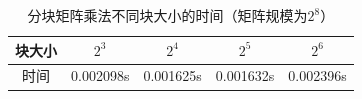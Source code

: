 \documentclass[UTF8]{article}
\begin{document}
    \begin{table}[H]
        \centering
        \caption{分块矩阵乘法不同块大小的时间（矩阵规模为$2^8$）}
        \begin{tabular}{ccccc}
            \hline
            块大小 & $2^3$ & $2^4$ & $2^5$ & $2^6$ \\
            \hline
            时间 & 0.002098s & 0.001625s & 0.001632s & 0.002396s \\
            \hline
        \end{tabular}
        \label{cpu blocksize influence}
    \end{table}
\end{document}
